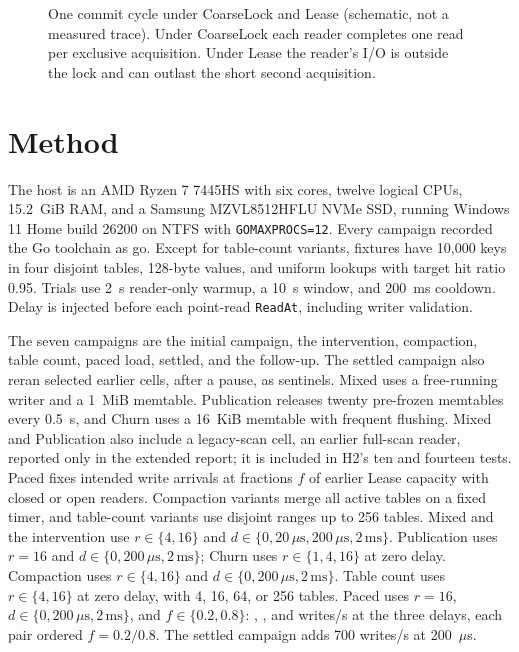 \documentclass[conference]{IEEEtran}
\begin{document}
\begin{figure}[t]
\caption{One commit cycle under CoarseLock and Lease (schematic, not a measured trace). Under CoarseLock each reader completes one read per exclusive acquisition. Under Lease the reader's I/O is outside the lock and can outlast the short second acquisition.}
\label{fig:timeline}
\end{figure}

\section{Method}
\label{sec:method}
The host is an AMD Ryzen 7 7445HS with six cores, twelve logical CPUs, 15.2~GiB RAM, and a Samsung MZVL8512HFLU NVMe SSD, running Windows 11 Home build 26200 on NTFS with \texttt{GOMAXPROCS=12}. Every campaign recorded the Go toolchain as go\GoVersion{}. Except for table-count variants, fixtures have 10,000 keys in four disjoint tables, 128-byte values, and uniform lookups with target hit ratio 0.95. Trials use 2~s reader-only warmup, a 10~s window, and 200~ms cooldown. Delay is injected before each point-read \texttt{ReadAt}, including writer validation.

The seven campaigns are the initial campaign, the intervention, compaction, table count, paced load, settled, and the follow-up. The settled campaign also reran selected earlier cells, after a pause, as sentinels. Mixed uses a free-running writer and a 1~MiB memtable. Publication releases twenty pre-frozen memtables every 0.5~s, and Churn uses a 16~KiB memtable with frequent flushing. Mixed and Publication also include a legacy-scan cell, an earlier full-scan reader, reported only in the extended report; it is included in H2's ten and fourteen tests. Paced fixes intended write arrivals at fractions $f$ of earlier Lease capacity with closed or open readers. Compaction variants merge all active tables on a fixed timer, and table-count variants use disjoint ranges up to 256 tables. Mixed and the intervention use $r\in\{4, 16\}$ and $d\in\{0, 20\,\mu\mathrm{s},200\,\mu\mathrm{s},2\,\mathrm{ms}\}$. Publication uses $r=16$ and $d\in\{0, 200\,\mu\mathrm{s},2\,\mathrm{ms}\}$; Churn uses $r\in\{1, 4, 16\}$ at zero delay. Compaction uses $r\in\{4, 16\}$ and $d\in\{0, 200\,\mu\mathrm{s},2\,\mathrm{ms}\}$. Table count uses $r\in\{4, 16\}$ at zero delay, with 4, 16, 64, or 256 tables. Paced uses $r=16$, $d\in\{0, 200\,\mu\mathrm{s},2\,\mathrm{ms}\}$, and $f\in\{0.2, 0.8\}$: \PacedRatesZero{}, \PacedRatesMedium{}, and \PacedRatesHigh{} writes/s at the three delays, each pair ordered $f=0.2/0.8$. The settled campaign adds 700 writes/s at 200~$\mu$s.
\end{document}

